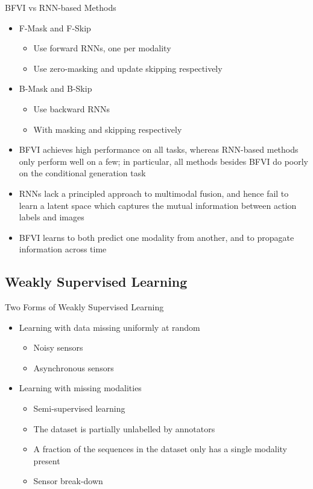 \documentclass{beamer}
\begin{document}
\begin{frame}{BFVI vs RNN-based Methods}
\begin{itemize}
\item F-Mask and F-Skip
\begin{itemize}
\item Use forward RNNs, one per modality
\item Use zero-masking and update skipping respectively
\end{itemize}
\item B-Mask and B-Skip
\begin{itemize}
\item Use backward RNNs
\item With masking and skipping respectively
\end{itemize}
\item BFVI achieves high performance on all tasks, whereas RNN-based methods only perform well on a few; in particular, all methods besides BFVI do poorly on the conditional generation task
\item RNNs lack a principled approach to multimodal fusion, and hence fail to learn a latent space which captures the mutual information between action labels and images
\item BFVI learns to both predict one modality from another, and to propagate information across time
\end{itemize}
\end{frame}

\subsection{Weakly Supervised Learning}

\begin{frame}{Two Forms of Weakly Supervised Learning}
\begin{itemize}
\item Learning with data missing uniformly at random
\begin{itemize}
\item Noisy sensors
\item Asynchronous sensors
\end{itemize}
\item Learning with missing modalities
\begin{itemize}
\item Semi-supervised learning
\item The dataset is partially unlabelled by annotators
\item A fraction of the sequences in the dataset only has a single modality present
\item Sensor break-down
\end{itemize}
\end{itemize}
\end{frame}
\end{document}
